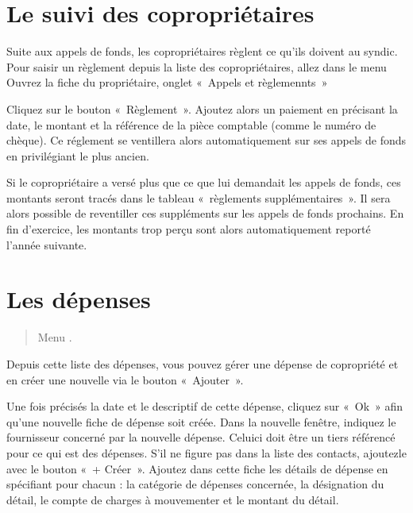 \documentclass[a4paper,10pt,oneside,french]{sphinxmanual}
\begin{document}
\sphinxstepscope


\section{Le suivi des copropriétaires}
\label{\detokenize{condominium/payoff:le-suivi-des-coproprietaires}}\label{\detokenize{condominium/payoff::doc}}
\sphinxAtStartPar
Suite aux appels de fonds, les copropriétaires règlent ce qu’ils doivent au syndic.
Pour saisir un règlement depuis la liste des copropriétaires, allez dans le menu 
Ouvrez la fiche du propriétaire, onglet « Appels et règlemennts »
\begin{quote}

\noindent{}
\end{quote}

\sphinxAtStartPar
Cliquez sur le bouton « Règlement ».
Ajoutez alors un paiement en précisant la date, le montant et la référence de la pièce comptable (comme le numéro de chèque).
Ce réglement se ventillera alors automatiquement sur ses appels de fonds en privilégiant le plus ancien.

\sphinxAtStartPar
Si le copropriétaire a versé plus que ce que lui demandait les appels de fonds, ces montants seront tracés dans le tableau « règlements supplémentaires ».
Il sera alors possible de reventiller ces suppléments sur les appels de fonds prochains.
En fin d’exercice, les montants trop perçu sont alors automatiquement reporté l’année suivante.

\sphinxstepscope


\section{Les dépenses}
\label{\detokenize{condominium/expense:les-depenses}}\label{\detokenize{condominium/expense::doc}}\begin{quote}

\sphinxAtStartPar
Menu .
\end{quote}

\sphinxAtStartPar
Depuis cette liste des dépenses, vous pouvez gérer une dépense de copropriété et en créer une nouvelle via le bouton « Ajouter ».

\sphinxAtStartPar
Une fois précisés la date et le descriptif de cette dépense, cliquez sur « Ok » afin qu’une nouvelle fiche de dépense soit créée.
Dans la nouvelle fenêtre, indiquez le fournisseur concerné par la nouvelle dépense. Celui\sphinxhyphen{}ci doit être un tiers référencé pour ce qui est des dépenses. S’il ne figure pas dans la liste des contacts, ajoutez\sphinxhyphen{}le avec le bouton « + Créer ».
Ajoutez dans cette fiche les détails de dépense en spécifiant pour chacun : la catégorie de dépenses concernée, la désignation du détail, le compte de charges à mouvementer et le montant du détail.
\begin{quote}

\noindent{}
\end{quote}
\end{document}
